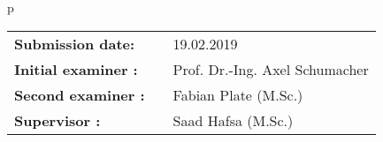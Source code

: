 \begin{center}
\begin{tabular}{p{\textwidth}}
\begin{center}
\begin{tabular}{lll}
\textbf{Submission date:} & & 19.02.2019\\
\textbf{Initial examiner :} & & Prof. Dr.-Ing. Axel Schumacher\\
\textbf{Second examiner :} & & Fabian Plate (M.Sc.)\\
\textbf{Supervisor :} & & Saad Hafsa (M.Sc.)\\


\end{tabular}
\end{center}

\end{tabular}
\end{center}
\thispagestyle{empty}